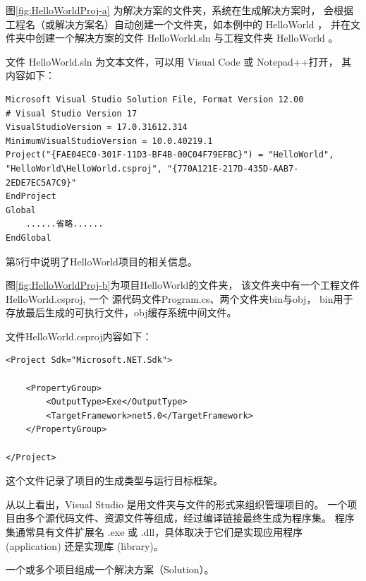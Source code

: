 图\ref{fig:HelloWorldProj-a} 为解决方案的文件夹，系统在生成解决方案时，
会根据工程名（或解决方案名）自动创建一个文件夹，如本例中的 HelloWorld ，
并在文件夹中创建一个解决方案的文件 HelloWorld.sln 与工程文件夹 HelloWorld 。

文件 HelloWorld.sln 为文本文件，可以用 Visual Code 或 Notepad++打开，
其内容如下：

\begin{lstlisting}
Microsoft Visual Studio Solution File, Format Version 12.00
# Visual Studio Version 17
VisualStudioVersion = 17.0.31612.314
MinimumVisualStudioVersion = 10.0.40219.1
Project("{FAE04EC0-301F-11D3-BF4B-00C04F79EFBC}") = "HelloWorld", "HelloWorld\HelloWorld.csproj", "{770A121E-217D-435D-AAB7-2EDE7EC5A7C9}"
EndProject
Global
	......省略......
EndGlobal
\end{lstlisting}

第5行中说明了HelloWorld项目的相关信息。

图\ref{fig:HelloWorldProj-b}为项目HelloWorld的文件夹，
该文件夹中有一个工程文件HelloWorld.csproj,
一个  \cs  源代码文件Program.cs、两个文件夹bin与obj，
bin用于存放最后生成的可执行文件，obj缓存系统中间文件。

文件HelloWorld.csproj内容如下：
\begin{lstlisting}
<Project Sdk="Microsoft.NET.Sdk">

	<PropertyGroup>
		<OutputType>Exe</OutputType>
		<TargetFramework>net5.0</TargetFramework>
	</PropertyGroup>

</Project>
\end{lstlisting}

这个文件记录了项目的生成类型与运行目标框架。

从以上看出，Visual Studio 是用文件夹与文件的形式来组织管理项目的。
一个项目由多个源代码文件、资源文件等组成，经过编译链接最终生成为程序集。
程序集通常具有文件扩展名 .exe 或 .dll，具体取决于它们是实现应用程序 (application) 还是实现库 (library)。

一个或多个项目组成一个解决方案（Solution）。


